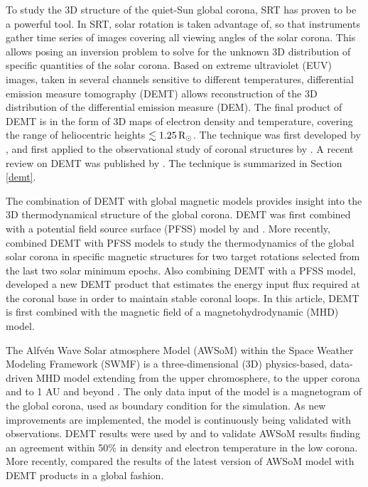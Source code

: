 \documentclass[namedreferences]{solarphysics}
\newcommand{\mrsun}{{\rm R_\odot}}
\begin{document}
\begin{article}
To study the {3D structure of the quiet-Sun global corona,} SRT has proven to be a powerful tool. {In SRT, solar rotation is taken advantage of, so that instruments gather time series of images covering all viewing angles of the solar corona. This allows posing an inversion problem to solve for the unknown 3D distribution of specific quantities of the solar corona. Based on extreme ultraviolet (EUV) images, taken in several channels sensitive to different temperatures, differential emission measure tomography (DEMT) allows reconstruction of the 3D distribution of the differential emission measure (DEM). The final product of DEMT is in the form of 3D maps of electron density and temperature, covering the range of heliocentric heights $\lesssim 1.25\,\mrsun$.} The technique was first developed by \citet{frazin_2009}, and first applied to the observational study of coronal structures by \citet{vasquez_2009}. {A recent review on DEMT was published by \citet{vasquez_2016}. The technique is summarized in Section \ref{demt}.}

{The combination of DEMT with global magnetic models provides insight} into the 3D thermodynamical structure of the global corona. {DEMT was first combined with a potential field source surface (PFSS) model by \citet{huang_2012} and \citet{nuevo_2013}. More recently,} \citet{lloveras_2017} combined DEMT with PFSS {models to study the thermodynamics of the global solar corona in specific magnetic structures for two target rotations selected from the last two solar minimum epochs. Also combining DEMT with a PFSS model,} \citet{maccormack_2017} developed a new DEMT product that estimates the energy input flux {required at the coronal base in order to maintain stable coronal loops}. In this article, {DEMT is first combined with the magnetic field of a magnetohydrodynamic (MHD) model.}

The Alfv\'{e}n Wave Solar atmosphere Model (AWSoM) within the Space Wea\-ther Modeling Framework (SWMF) is a three-dimensional (3D) physics-based, data-driven MHD model extending from the upper chromosphere, to the upper corona and to {1 AU and beyond} \citep{vander_2010, Van2014}. {The only data input of the model is a magnetogram of the global corona, used as boundary condition for the simulation. As new improvements are implemented, the model is continuously being validated with observations.} DEMT results were used by \citet{jin_2012} and \citet{oran_2015} to validate AWSoM results finding an agreement within 50\% in density and electron temperature in the low corona. More recently, \citet{sachdeva_2019} compared the results of the latest version of AWSoM model with DEMT products in a global fashion. 


\end{article}
\end{document}
